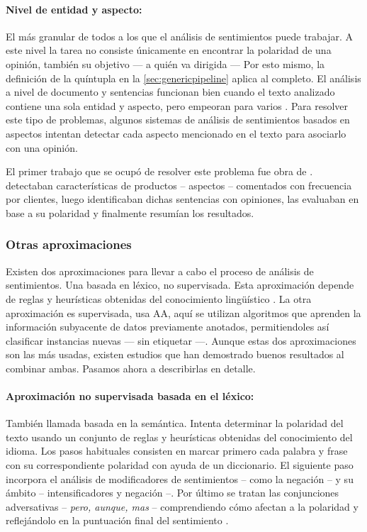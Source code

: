 \paragraph{Nivel de entidad y aspecto:} El más granular de todos a los que el
análisis de sentimientos puede trabajar. A este nivel la tarea no consiste
únicamente en encontrar la polaridad de una opinión, también su objetivo --- a
quién va dirigida --- Por esto mismo, la definición de la quíntupla en la
\autoref{sec:genericpipeline} aplica al completo. El análisis a nivel de
documento y sentencias funcionan bien cuando el texto analizado contiene una
sola entidad y aspecto, pero empeoran para varios \cite{Feldman2013}. Para
resolver este tipo de problemas, algunos sistemas de análisis de sentimientos
basados en aspectos intentan detectar cada aspecto mencionado en el texto para
asociarlo con una opinión.

El primer trabajo que se ocupó de resolver este problema fue obra de
\citet{Hu2004}. \citeauthor{Hu2004} detectaban características de productos --
aspectos -- comentados con frecuencia por clientes, luego identificaban dichas
sentencias con opiniones, las evaluaban en base a su polaridad y finalmente
resumían los resultados.

\subsubsection{Otras aproximaciones}
\label{sec:approaches}

Existen dos aproximaciones para llevar a cabo el proceso de análisis de
sentimientos. Una basada en léxico, no supervisada. Esta aproximación depende
de reglas y heurísticas obtenidas del conocimiento lingüístico
\cite{VILARES2013}. La otra aproximación es supervisada, usa \ac{AA}, aquí se
utilizan algoritmos que aprenden la información subyacente de datos previamente
anotados, permitiendoles así clasificar instancias nuevas --- sin etiquetar
\cite{Pang2002} ---. Aunque estas dos aproximaciones son las más usadas, existen
estudios que han demostrado buenos resultados al combinar ambas. Pasamos ahora a
describirlas en detalle.

\paragraph{Aproximación no supervisada basada en el léxico:} También llamada
basada en la semántica. Intenta determinar la polaridad del texto usando un
conjunto de reglas y heurísticas obtenidas del conocimiento del idioma. Los
pasos habituales consisten en marcar primero cada palabra y frase con su
correspondiente polaridad con ayuda de un diccionario. El siguiente paso
incorpora el análisis de modificadores de sentimientos -- como la negación -- y
su ámbito -- intensificadores y negación --. Por último se tratan las
conjunciones adversativas -- \emph{pero, aunque, mas} -- comprendiendo cómo
afectan a la polaridad y reflejándolo en la puntuación final del sentimiento
\cite{Liu2012}.

